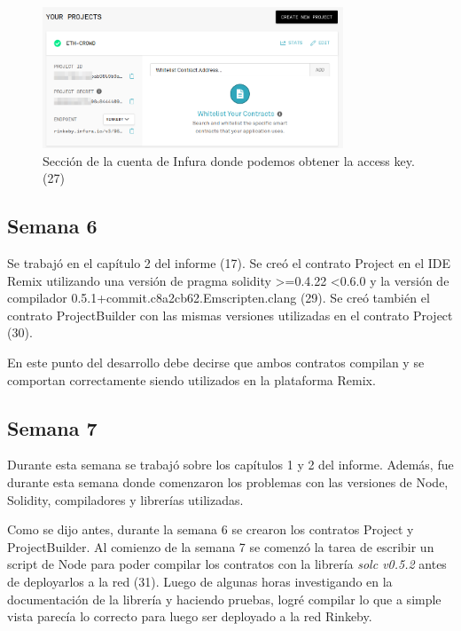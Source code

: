 \begin{figure}[htbp!] 
\centering    
\includegraphics[width=0.8\textwidth]{infura-key}
\caption[infurakey]{Sección de la cuenta de Infura donde podemos obtener la access key. (27)}
\label{fig:infura-key}
\end{figure}

\subsection{Semana 6}
Se trabajó en el capítulo 2 del informe (17). Se creó el contrato Project en el IDE Remix
utilizando una versión de pragma solidity >=0.4.22 <0.6.0 y la versión de compilador
0.5.1+commit.c8a2cb62.Emscripten.clang (29). Se creó también el contrato ProjectBuilder con las 
mismas versiones utilizadas en el contrato Project (30).

En este punto del desarrollo debe decirse que ambos contratos compilan y se comportan correctamente
siendo utilizados en la plataforma Remix.

\subsection{Semana 7}
Durante esta semana se trabajó sobre los capítulos 1 y 2 del informe. Además, fue durante esta
semana donde comenzaron los problemas con las versiones de Node, Solidity, compiladores y librerías
utilizadas.

Como se dijo antes, durante la semana 6 se crearon los contratos Project y ProjectBuilder. Al 
comienzo de la semana 7 se comenzó la tarea de escribir un script de Node para poder compilar
los contratos con la librería \textit{solc v0.5.2} antes de deployarlos a la red (31). Luego de 
algunas horas investigando en la documentación de la librería y haciendo pruebas, logré compilar
lo que a simple vista parecía lo correcto para luego ser deployado a la red Rinkeby.

